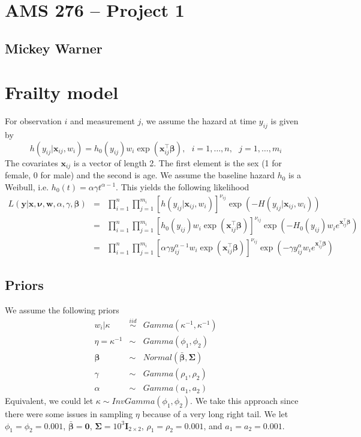 \documentclass[12pt]{article}
\newcommand{\m}[1]{\mathbf{\bm{#1}}}
\begin{document}
\section*{AMS 276 -- Project 1}
\subsection*{Mickey Warner}
\bigskip
\bigskip

\section*{Frailty model}

\noindent For observation $i$ and measurement $j$, we assume the hazard at time $y_{ij}$ is given by
\[ h(y_{ij}|\m{x}_{ij}, w_i) = h_0(y_{ij})w_i\exp(\m{x}_{ij}^\top\m{\beta}),~~~i=1,\ldots,n,~~~j=1,\ldots,m_i \] 
\noindent The covariates $\m{x}_{ij}$ is a vector of length 2. The first element is the sex (1 for female, 0 for male) and the second is age. We assume the baseline hazard $h_0$ is a Weibull, i.e. $h_0(t)=\alpha\gamma t^{\alpha-1}$. This yields the following likelihood
\begin{eqnarray*}
L(\m{y}|\m{x},\m{\nu},\m{w},\alpha,\gamma,\m{\beta}) &=& \prod_{i=1}^n \prod_{j=1}^{m_i} \left[h(y_{ij}|\m{x}_{ij},w_i)\right]^{\nu_{ij}} \exp\left(-H(y_{ij}|\m{x}_{ij},w_i)\right) \\
 &=& \prod_{i=1}^n \prod_{j=1}^{m_i} \left[h_0(y_{ij})w_i\exp(\m{x}_{ij}^\top\m{\beta})\right]^{\nu_{ij}} \exp\left(-H_0(y_{ij})w_ie^{\m{x}_{ij}^\top\m{\beta}}\right) \\
 &=& \prod_{i=1}^n \prod_{j=1}^{m_i} \left[\alpha\gamma y_{ij}^{\alpha-1}w_i\exp(\m{x}_{ij}^\top\m{\beta})\right]^{\nu_{ij}} \exp\left(-\gamma y_{ij}^\alpha w_ie^{\m{x}_{ij}^\top\m{\beta}}\right)
\end{eqnarray*}

\subsection*{Priors}

\noindent We assume the following priors
\begin{eqnarray*}
w_i | \kappa &\overset{iid}\sim& Gamma(\kappa^{-1},\kappa^{-1}) \\
\eta = \kappa^{-1} &\sim& Gamma(\phi_1,\phi_2) \\
\m{\beta} &\sim& Normal(\bar{\m{\beta}}, \m{\Sigma}) \\
\gamma &\sim& Gamma(\rho_1,\rho_2) \\
\alpha &\sim& Gamma(a_1, a_2)
\end{eqnarray*}
\noindent Equivalent, we could let $\kappa \sim InvGamma(\phi_1,\phi_2)$. We take this approach since there were some issues in sampling $\eta$ because of a very long right tail. We let $\phi_1=\phi_2=0.001$, $\bar{\m{\beta}}=\m{0}$, $\m{\Sigma}=10^3 \m{I}_{2\times 2}$, $\rho_1=\rho_2=0.001$, and $a_1=a_2=0.001$.
\end{document}
